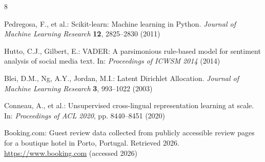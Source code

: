 \documentclass[runningheads]{llncs}
\begin{document}
\begin{thebibliography}{8}
\sloppy

Pedregosa, F., et al.: Scikit-learn: Machine learning in Python.
\textit{Journal of Machine Learning Research} \textbf{12}, 2825--2830
(2011)

Hutto, C.J., Gilbert, E.: VADER: A parsimonious rule-based model for
sentiment analysis of social media text. In: \textit{Proceedings of
ICWSM 2014} (2014)

Blei, D.M., Ng, A.Y., Jordan, M.I.: Latent Dirichlet Allocation.
\textit{Journal of Machine Learning Research} \textbf{3}, 993--1022
(2003)

Conneau, A., et al.: Unsupervised cross-lingual representation learning
at scale. In: \textit{Proceedings of ACL 2020}, pp. 8440--8451 (2020)

Booking.com: Guest review data collected from publicly accessible review
pages for a boutique hotel in Porto, Portugal. Retrieved 2026.
\url{https://www.booking.com} (accessed 2026)

\end{thebibliography}
\end{document}
